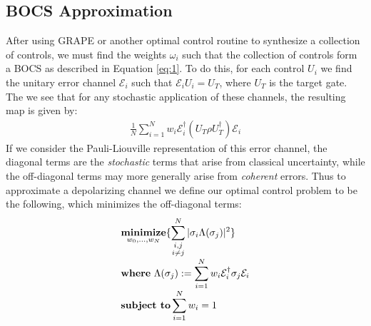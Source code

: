 \documentclass[aps,nofootinbib,pra,notitlepage,twocolumn]{revtex4-1}
\begin{document}
\subsection{BOCS Approximation}
After using GRAPE or another optimal control routine to synthesize a collection of controls, we must find the weights $\omega_i$ such that the collection of controls form a BOCS as described in Equation \ref{eq:1}. To do this, for each control $U_i$ we find the unitary error channel $\mathcal{E}_i$ such that $\mathcal{E}_iU_i=U_T$, where $U_T$ is the target gate. The we see that for any stochastic application of these channels, the resulting map is given by:
\begin{align}
 \frac{1}{N} \sum^N_{i=1} w_i \mathcal{E}_i^{\dagger} (U_T\rho U_T^{\dagger}) \mathcal{E}_i
\end{align} If we consider the Pauli-Liouville representation\cite{Kimmel2014} of this error channel, the diagonal terms are the \textit{stochastic} terms that arise from classical uncertainty, while the off-diagonal terms may more generally arise from \textit{coherent} errors\cite{Ware2018}.
Thus to approximate a depolarizing channel we define our optimal control problem to be the following, which minimizes the off-diagonal terms:
\begin{equation}\label{eq:minimization}
\setlength{\jot}{0pt}
  \begin{split}
    &\underset{w_0, ..., w_N}{\textbf{minimize}} \{\sum_{\substack{i,j \\ i\neq j}}^N|\sigma_i\Lambda(\sigma_j)|^2\}\\
    &\textbf{where}\ \Lambda(\sigma_j) := \sum^N_{i=1}w_i\mathcal{E}_i^{\dagger}\sigma_j\mathcal{E}_i\\
    &\textbf{subject to} \sum_{i=1}^Nw_i = 1
  \end{split}
\end{equation}
\end{document}
